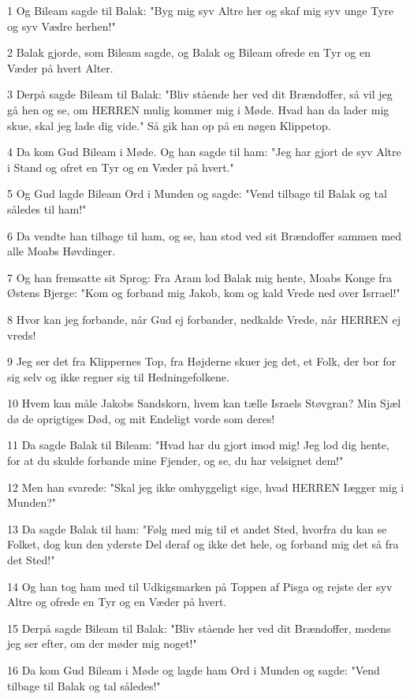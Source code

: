 \par 1 Og Bileam sagde til Balak: "Byg mig syv Altre her og skaf mig syv unge Tyre og syv Vædre herhen!"
\par 2 Balak gjorde, som Bileam sagde, og Balak og Bileam ofrede en Tyr og en Væder på hvert Alter.
\par 3 Derpå sagde Bileam til Balak: "Bliv stående her ved dit Brændoffer, så vil jeg gå hen og se, om HERREN mulig kommer mig i Møde. Hvad han da lader mig skue, skal jeg lade dig vide." Så gik han op på en nøgen Klippetop.
\par 4 Da kom Gud Bileam i Møde. Og han sagde til ham: "Jeg har gjort de syv Altre i Stand og ofret en Tyr og en Væder på hvert."
\par 5 Og Gud lagde Bileam Ord i Munden og sagde: "Vend tilbage til Balak og tal således til ham!"
\par 6 Da vendte han tilbage til ham, og se, han stod ved sit Brændoffer sammen med alle Moabs Høvdinger.
\par 7 Og han fremsatte sit Sprog: Fra Aram lod Balak mig hente, Moabs Konge fra Østens Bjerge: "Kom og forband mig Jakob, kom og kald Vrede ned over Isrrael!"
\par 8 Hvor kan jeg forbande, når Gud ej forbander, nedkalde Vrede, når HERREN ej vreds!
\par 9 Jeg ser det fra Klippernes Top, fra Højderne skuer jeg det, et Folk, der bor for sig selv og ikke regner sig til Hedningefolkene.
\par 10 Hvem kan måle Jakobs Sandskorn, hvem kan tælle Israels Støvgran? Min Sjæl dø de oprigtiges Død, og mit Endeligt vorde som deres!
\par 11 Da sagde Balak til Bileam: "Hvad har du gjort imod mig! Jeg lod dig hente, for at du skulde forbande mine Fjender, og se, du har velsignet dem!"
\par 12 Men han svarede: "Skal jeg ikke omhyggeligt sige, hvad HERREN Iægger mig i Munden?"
\par 13 Da sagde Balak til ham: "Følg med mig til et andet Sted, hvorfra du kan se Folket, dog kun den yderste Del deraf og ikke det hele, og forband mig det så fra det Sted!"
\par 14 Og han tog ham med til Udkigsmarken på Toppen af Pisga og rejste der syv Altre og ofrede en Tyr og en Væder på hvert.
\par 15 Derpå sagde Bileam til Balak: "Bliv stående her ved dit Brændoffer, medens jeg ser efter, om der møder mig noget!"
\par 16 Da kom Gud Bileam i Møde og lagde ham Ord i Munden og sagde: "Vend tilbage til Balak og tal således!"
